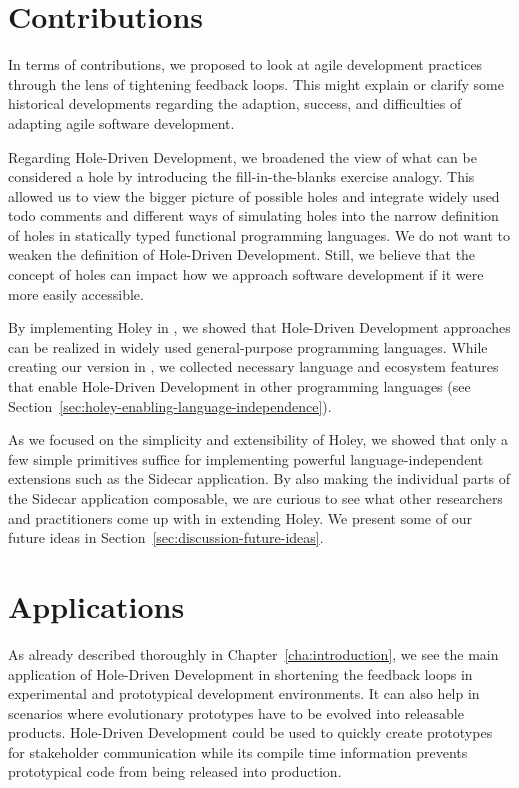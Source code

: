 \section{Contributions}
\label{sec:discussion-contributions}
In terms of contributions, we proposed to look at agile development practices through the lens of tightening feedback loops.
This might explain or clarify some historical developments regarding the adaption, success, and difficulties of adapting agile software development.

Regarding Hole-Driven Development, we broadened the view of what can be considered a hole by introducing the fill-in-the-blanks exercise analogy.
This allowed us to view the bigger picture of possible holes and integrate widely used todo comments and different ways of simulating holes into the narrow definition of holes in statically typed functional programming languages.
We do not want to weaken the definition of Hole-Driven Development.
Still, we believe that the concept of holes can impact how we approach software development if it were more easily accessible.

By implementing Holey in \CS, we showed that Hole-Driven Development approaches can be realized in widely used general-purpose programming languages.
While creating our version in \CS, we collected necessary language and ecosystem features that enable Hole-Driven Development in other programming languages (see Section~\ref{sec:holey-enabling-language-independence}).

As we focused on the simplicity and extensibility of Holey, we showed that only a few simple primitives suffice for implementing powerful language-independent extensions such as the Sidecar application.
By also making the individual parts of the Sidecar application composable, we are curious to see what other researchers and practitioners come up with in extending Holey.
We present some of our future ideas in Section~\ref{sec:discussion-future-ideas}.


\section{Applications}
\label{sec:discussion-applications}
As already described thoroughly in Chapter~\ref{cha:introduction}, we see the main application of Hole-Driven Development in shortening the feedback loops in experimental and prototypical development environments.
It can also help in scenarios where evolutionary prototypes have to be evolved into releasable products.
Hole-Driven Development could be used to quickly create prototypes for stakeholder communication while its compile time information prevents prototypical code from being released into production.

